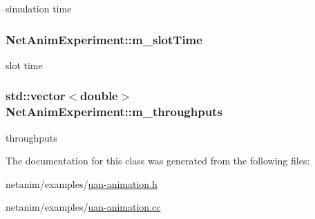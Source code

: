 simulation time 

\subsubsection[{\texorpdfstring{m\+\_\+slot\+Time}{m_slotTime}}]{ Net\+Anim\+Experiment\+::m\+\_\+slot\+Time}\hypertarget{classNetAnimExperiment_a8775f236cd5acfc6d68139e14d58f342}{}\label{classNetAnimExperiment_a8775f236cd5acfc6d68139e14d58f342}


slot time 

\subsubsection[{\texorpdfstring{m\+\_\+throughputs}{m_throughputs}}]{\setlength{\rightskip}{0pt plus 5cm}std\+::vector$<$double$>$ Net\+Anim\+Experiment\+::m\+\_\+throughputs}\hypertarget{classNetAnimExperiment_a1fd810b388bb85c8c2e622c914ef5d03}{}\label{classNetAnimExperiment_a1fd810b388bb85c8c2e622c914ef5d03}


throughputs 



The documentation for this class was generated from the following files\+:\begin{DoxyCompactItemize}
\item 
netanim/examples/\hyperlink{uan-animation_8h}{uan-\/animation.\+h}\item 
netanim/examples/\hyperlink{uan-animation_8cc}{uan-\/animation.\+cc}\end{DoxyCompactItemize}
